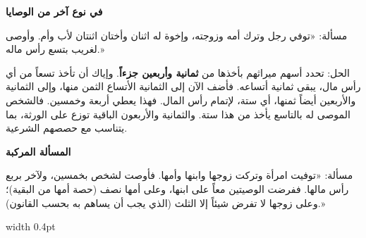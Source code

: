 \documentclass[11pt,a4paper]{book}
\begin{document}
\newpage

\noindent\begin{minipage}[t]{0.48\textwidth}
\raggedleft

\begin{Arabic}
\textbf{في نوع آخر من الوصايا}

مسألة: «توفي رجل وترك أمه وزوجته، وإخوة له اثنان وأختان اثنتان لأب وأم. وأوصى لغريب بتسع رأس ماله.»

الحل: تحدد أسهم ميراثهم بأخذها من \textbf{ثمانية وأربعين جزءاً}. وإياك أن تأخذ تسعاً من أي رأس مال، يبقى ثمانية أتساعه. فأضف الآن إلى الثمانية الأتساع الثمن منها، وإلى الثمانية والأربعين أيضاً ثمنها، أي ستة، لإتمام رأس المال. فهذا يعطي أربعة وخمسين. فالشخص الموصى له بالتاسع يأخذ من هذا ستة. والثمانية والأربعون الباقية توزع على الورثة، بما يتناسب مع حصصهم الشرعية.

\textbf{المسألة المركبة}

مسألة: «توفيت امرأة وتركت زوجها وابنها وأمها. فأوصت لشخص بخمسين، ولآخر بربع رأس مالها. ففرضت الوصيتين معاً على ابنها، وعلى أمها نصف (حصة أمها من البقية)؛ وعلى زوجها لا تفرض شيئاً إلا الثلث (الذي يجب أن يساهم به بحسب القانون).»
\end{Arabic}

\end{minipage}%
\hfill\vrule width 0.4pt\hfill
\end{document}
